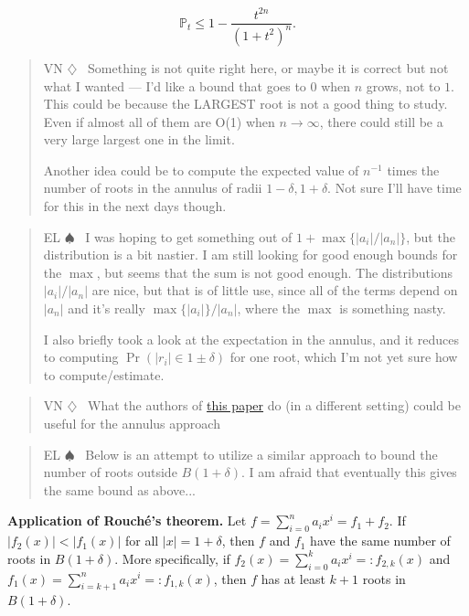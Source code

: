 \documentclass[12pt]{article}
\def\P{\mathbb{P}}
\newenvironment{vn}{\begin{quote}\color{myviolet} \small\sf VN $\diamondsuit$~}{\end{quote}}
\newenvironment{el}{\begin{quote}\color{amethyst} \small\sf EL $\spadesuit$~}{\end{quote}}
\begin{document}
\[ \P_t \leq 1 - \frac{t^{2n}}{(1+t^2)^n}.   \]

\begin{vn}
    Something is not quite right here, or maybe it is correct but not what I wanted --- I'd like a bound that goes to $0$ when $n$ grows, not to $1$. This could be because the LARGEST root is not a good thing to study. Even if almost all of them are O(1) when $n \rightarrow \infty$, there could still be a very large largest one in the limit.

Another idea could be to compute the expected value of $n^{-1}$ times the number of roots in the annulus of radii $1-\delta,1+\delta$. Not sure I'll have time for this in the next days though.
\end{vn}


\begin{el}
    I was hoping to get something out of $1 + \max \{ |a_i|/|a_n|\}$, but the distribution is a bit nastier.
    I am still looking for good enough bounds for the $\max$, but seems that  the sum is not good enough. 
    The distributions $|a_i|/|a_n|$ are nice, but that is of little use, since all of the terms depend on $|a_n|$ and it's really $\max\{|a_i|\}/|a_n|$, where the $\max$ is something nasty.

    I also briefly took a look at the expectation in the annulus, and it reduces to computing $\Pr(|r_i| \in 1 \pm \delta)$ for one root, which I'm not yet sure how to compute/estimate.
\end{el}

\begin{vn}
What the authors of \hyperlink{
https://arxiv.org/abs/1104.5360}{this paper} do (in a different setting)
could be useful for the annulus approach 
\end{vn}

\begin{el}
    Below is an attempt to utilize a similar approach to bound the number of roots outside $B(1+\delta)$. I am afraid that eventually this gives the same bound as above...
\end{el}


{\bf Application of Rouché's theorem.}
Let $f = \sum_{i=0}^n a_i x^i = f_1 + f_2$. If $|f_2(x)| < |f_1(x)|$ for all $|x| = 1+\delta$, then $f$ and $f_1$ have the same number of roots in $B(1+\delta)$. More specifically, if $f_2(x) = \sum_{i=0}^k a_i x^i =: f_{2,k}(x)$ and $f_1(x) = \sum_{i=k+1}^n a_i x^i =: f_{1,k}(x)$, then $f$ has at least $k+1$ roots in $B(1+\delta)$.
\end{document}
